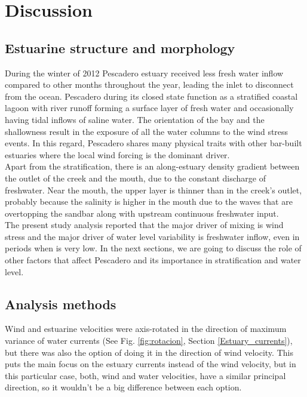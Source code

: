 \documentclass[tesis.tex]{subfiles}
\begin{document}
    
\section{Discussion}

\subsection{Estuarine structure and morphology}

During the winter of 2012 Pescadero estuary received less fresh water inflow compared to other months throughout the year, leading the inlet to disconnect from the ocean. Pescadero during its closed state function as a stratified coastal lagoon with river runoff forming a surface layer of fresh water and occasionally having tidal inflows of saline water. The orientation of the bay and the shallowness result in the exposure of all the water columns to the wind stress events. In this regard, Pescadero shares many physical traits with other bar-built estuaries where the local wind forcing is the dominant driver.\\

Apart from the stratification, there is an along-estuary density gradient between the outlet of the creek and the mouth, due to the constant discharge of freshwater. Near the mouth, the upper layer is thinner than in the creek's outlet, probably because the salinity is higher in the mouth due to the waves that are overtopping the sandbar along with upstream continuous freshwater input.\\

The present study analysis reported that the major driver of mixing is wind stress and the major driver of water level variability is freshwater inflow, even in periods when is very low. In the next sections, we are going to discuss the role of other factors that affect Pescadero and its importance in stratification and water level.\\

\subsection{Analysis methods}

Wind and estuarine velocities were axis-rotated in the direction of maximum variance of water currents (See Fig. \ref{fig:rotacion}, Section \ref{Estuary_currents}), but there was also the option of doing it in the direction of wind velocity. This puts the main focus on the estuary currents instead of the wind velocity, but in this particular case, both, wind and water velocities, have a similar principal direction, so it wouldn't be a big difference between each option.\\
\end{document}
